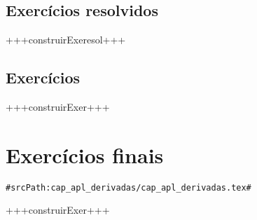 \subsection*{Exercícios resolvidos}

+++construirExeresol+++


\subsection*{Exercícios}

+++construirExer+++


\section{Exercícios finais}
\verb+#srcPath:cap_apl_derivadas/cap_apl_derivadas.tex#+


+++construirExer+++


